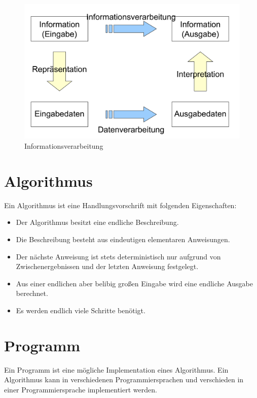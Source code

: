\documentclass[../main.tex]{subfiles}
\begin{document}
        \begin{figure}
             \centering
             \includegraphics[width=\textwidth]{Abbildungen/Informationsverarbeitung.png}
             \caption{Informationsverarbeitung}
             \label{figure:Informatik:Grundlagen:informationsverarbeitung}
        \end{figure}
    
    \section{Algorithmus}
        Ein Algorithmus ist eine Handlungsvorschrift mit folgenden Eigenschaften:
        
        \begin{itemize}
            \item Der Algorithmus besitzt eine endliche Beschreibung.
            \item Die Beschreibung besteht aus eindeutigen elementaren Anweisungen.
            \item Der nächste Anweisung ist stets deterministisch nur aufgrund von Zwischenergebnissen und der letzten Anweisung festgelegt.
            \item Aus einer endlichen aber belibig großen Eingabe wird eine endliche Ausgabe berechnet.
            \item Es werden endlich viele Schritte benötigt.
        \end{itemize}
    
    \section{Programm}
        Ein Programm ist eine mögliche Implementation eines Algorithmus. Ein Algorithmus kann in verschiedenen Programmiersprachen und verschieden in einer Programmiersprache implementiert werden.
        
\end{document}

